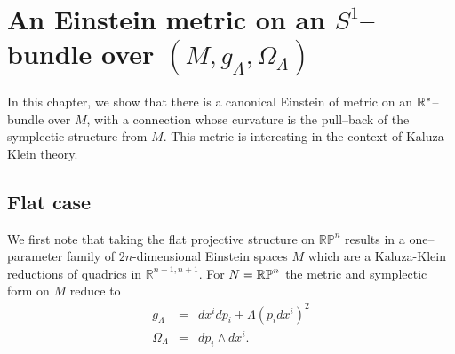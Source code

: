 
\chapter{An Einstein metric on an $S^1$--bundle over $(M,g_\Lambda,\Omega_\Lambda)$}
\label{chap:KK_lift}
In this chapter, we show that there is a canonical Einstein of metric on an $\mathbb{R}^*$--bundle over $M$, with a connection whose curvature is the pull--back
of the symplectic structure from $M$. This metric is interesting in the context of Kaluza-Klein theory.

\section{Flat case}

We first note that taking the flat projective structure on $\mathbb{RP}^{n}$
results in a one--parameter family of $2n$-dimensional Einstein spaces $M$ which are a Kaluza-Klein
reductions of quadrics in $\mathbb{R}^{n+1,n+1}$. For $N=\mathbb{RP}^n$
the metric and symplectic form on $M$ reduce to 
\begin{eqnarray*}
g_{\Lambda} & = &  dx^{i} dp_{i}+\Lambda(p_{i} dx^{i})^{2}\\
\Omega_{\Lambda} & = &  dp_{i}\wedge dx^{i}.
\end{eqnarray*}

